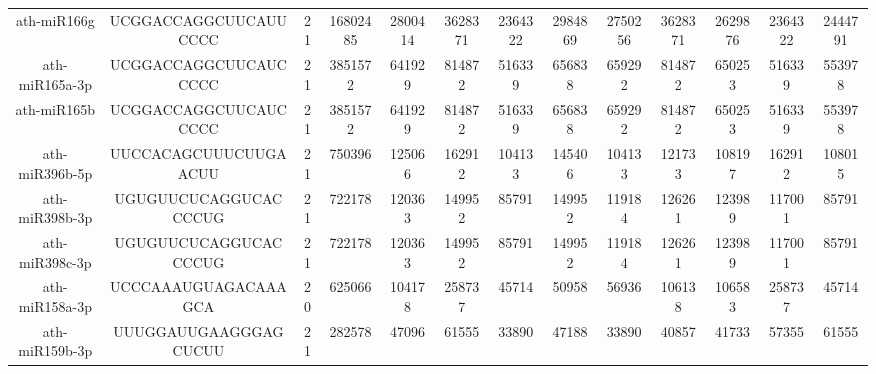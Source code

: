 \begin{landscape}
\begin{table}[]
\begin{tabular}{ccccccccccccc}
    ath-miR166g      & UCGGACCAGGCUUCAUUCCCC    & 21           & 16802485     & 2800414          & 3628371      & 2364322                      & 2984869              & 2750256              & 3628371               & 2629876               & 2364322               & 2444791               \\
    ath-miR165a-3p   & UCGGACCAGGCUUCAUCCCCC    & 21           & 3851572      & 641929           & 814872       & 516339                       & 656838               & 659292               & 814872                & 650253                & 516339                & 553978                \\
    ath-miR165b      & UCGGACCAGGCUUCAUCCCCC    & 21           & 3851572      & 641929           & 814872       & 516339                       & 656838               & 659292               & 814872                & 650253                & 516339                & 553978                \\
    ath-miR396b-5p   & UUCCACAGCUUUCUUGAACUU    & 21           & 750396       & 125066           & 162912       & 104133                       & 145406               & 104133               & 121733                & 108197                & 162912                & 108015                \\
    ath-miR398b-3p   & UGUGUUCUCAGGUCACCCCUG    & 21           & 722178       & 120363           & 149952       & 85791                        & 149952               & 119184               & 126261                & 123989                & 117001                & 85791                 \\
    ath-miR398c-3p   & UGUGUUCUCAGGUCACCCCUG    & 21           & 722178       & 120363           & 149952       & 85791                        & 149952               & 119184               & 126261                & 123989                & 117001                & 85791                 \\
    ath-miR158a-3p   & UCCCAAAUGUAGACAAAGCA     & 20           & 625066       & 104178           & 258737       & 45714                        & 50958                & 56936                & 106138                & 106583                & 258737                & 45714                 \\
    ath-miR159b-3p   & UUUGGAUUGAAGGGAGCUCUU    & 21           & 282578       & 47096            & 61555        & 33890                        & 47188                & 33890                & 40857                 & 41733                 & 57355                 & 61555                 \\

\end{tabular}
\end{table}
\end{landscape}
